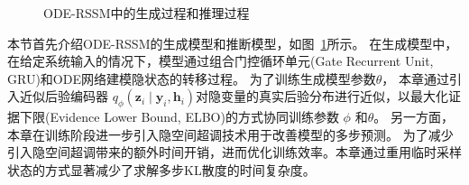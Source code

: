 \begin{figure}[ht]
%
%
\centering
\caption{ODE-RSSM中的生成过程和推理过程}
\label{fig:model_fig}
\end{figure}
本节首先介绍ODE-RSSM的生成模型和推断模型，如图~\ref{fig:model_fig}所示。
在生成模型中，在给定系统输入的情况下，模型通过组合门控循环单元(Gate Recurrent Unit, GRU)和ODE网络建模隐状态的转移过程。
为了训练生成模型参数$\theta$， 本章通过引入近似后验编码器 $q_{\phi}\left(\boldsymbol{z}_{i} \mid \boldsymbol{y}_{i}, \boldsymbol{h}_{i}\right)$对隐变量的真实后验分布进行近似，以最大化证据下限(Evidence Lower Bound, ELBO)的方式协同训练参数 $\phi$ 和$\theta$。
另一方面，本章在训练阶段进一步引入隐空间超调技术\cite{Hafner2019}用于改善模型的多步预测。
为了减少引入隐空间超调带来的额外时间开销，进而优化训练效率。本章通过重用临时采样状态的方式显著减少了求解多步KL散度的时间复杂度。


